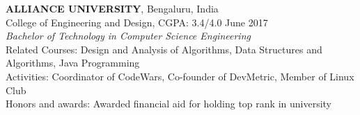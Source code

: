 \documentclass[a4paper]{article}
\newcommand{\myline}{\par
  \kern2pt %
  \hrule height 0.5pt
  \kern2pt %
}
\newcommand{\mybullet}{
	\indent \textbullet \hspace*{2mm}
}
\begin{document}
	\noindent
	\textbf{ALLIANCE UNIVERSITY}, Bengaluru, India \\
	\indent College of Engineering and Design, CGPA: 3.4/4.0 \hfill June 2017 \\
	\indent \textit{Bachelor of Technology in Computer Science Engineering} \\
	\indent Related Courses: Design and Analysis of Algorithms, Data Structures and Algorithms, Java Programming \\
	\indent Activities: Coordinator of CodeWars, Co-founder of DevMetric, Member of Linux Club \\
	\indent Honors and awards: Awarded financial aid for holding top rank in university\\
	
%		
	
\end{document}

